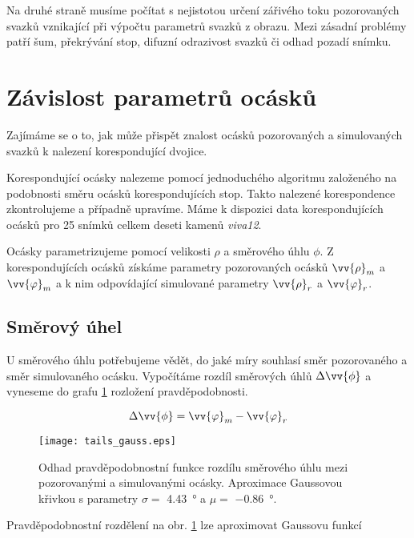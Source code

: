 Na druhé straně musíme počítat s nejistotou určení zářivého toku pozorovaných svazků vznikající při výpočtu parametrů svazků z obrazu. Mezi zásadní problémy patří šum, pře\-krý\-vá\-ní stop, difuzní odrazivost svazků či odhad pozadí snímku.  


\section{Závislost parametrů ocásků}

	Zajímáme se o to, jak může přispět znalost ocásků pozorovaných a simulovaných svazků k nalezení korespondující dvojice.  

  Korespondující ocásky nalezeme pomocí jednoduchého algoritmu založeného na podobnosti směru ocásků korespondujících stop. Takto nalezené korespondence zkontrolujeme a případně upravíme. Máme k dispozici data korespondujících ocásků pro 25 snímků celkem deseti kamenů \textit{viva12}. 
	
	Ocásky parametrizujeme pomocí velikosti $\rho$ a směrového úhlu $\phi$. Z korespondujících ocásků získáme parametry pozorovaných ocásků $\vv{\rho}_m$ a $\vv{\varphi}_m$ a k nim odpovídající simulované parametry $\vv{\rho}_r$ a $\vv{\varphi}_r$.
	

\subsection{Směrový úhel}
 U směrového úhlu potřebujeme vědět, do jaké míry souhlasí směr pozorovaného a směr simulovaného ocásku. Vypočítáme rozdíl směrových úhlů $\Delta\vv{\phi}$ a vyneseme do grafu \ref{fig: tail_depend1} rozložení pravděpodobnosti.  
 
 \begin{equation}
 \Delta\vv{\phi} = \vv{\varphi}_m - \vv{\varphi}_r
 \end{equation}
  
\begin{figure}[htps]
\centering
\texttt{[image: tails\_gauss.eps]}
\caption[Odhad pravděpodobnostní funkce rozdílu směrového úhlu mezi pozorovanými a simulovanými ocásky.]{Odhad pravděpodobnostní funkce rozdílu směrového úhlu mezi pozorovanými a simulovanými ocásky. Aproximace Gaussovou křivkou s parametry $\sigma = $ \SI{4.43}{\degree} a $\mu = $ \SI{-0.86}{\degree}. }
\label{fig: tail_depend1}
\end{figure}

Pravděpodobnostní rozdělení na obr. \ref{fig: tail_depend1} lze aproximovat Gaussovu funkcí

